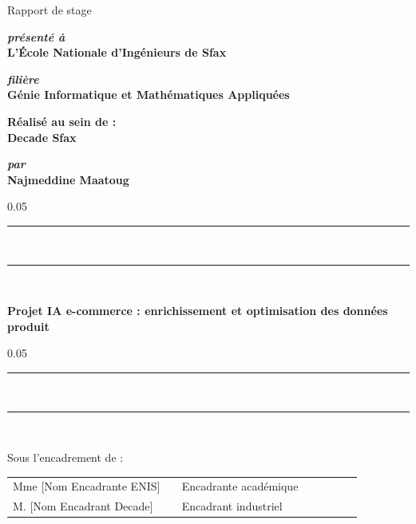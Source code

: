 \begin{titlepage}
\begin{center}
\vspace{10pt}
{%
  \renewcommand*{\familydefault}{\defaultFont}
  \fontsize{34pt}{34pt}\selectfont%
  Rapport de stage
}

\vspace{30pt}
\textbf{\textit{présenté à}}\\

\vspace{10pt}
{%
  \renewcommand*{\familydefault}{\defaultFont}
  \fontsize{16pt}{16pt}\selectfont%
  \textbf{L'École Nationale d'Ingénieurs de Sfax}
}

\vspace{20pt}
\textbf{\textit{filière}}\\

\vspace{10pt}
{%
\renewcommand*{\familydefault}{\defaultFont}
\fontsize{14pt}{14pt}\selectfont%
\textbf{Génie Informatique et Mathématiques Appliquées}
}

\vspace{20pt}
{%
\renewcommand*{\familydefault}{\defaultFont}
\fontsize{14pt}{14pt}\selectfont%
\textbf{Réalisé au sein de :}\\
\vspace{8pt}
\textbf{Decade Sfax}
}

\vspace{28pt}
\textbf{\textit{par}}\\
\vspace{8pt}
{%
  \fontsize{18pt}{18pt}\selectfont%
  \textbf{Najmeddine Maatoug}
}

\vspace{20pt}
{%
  \begin{spacing}{0.05}
    \rule{420pt}{2pt}\\
    \rule{420pt}{0.75pt}\\
  \end{spacing}
  \renewcommand*{\familydefault}{\defaultFont}
  \fontsize{18pt}{18pt}\selectfont%
  \vspace{12pt}
  \textbf{Projet IA e-commerce : enrichissement et optimisation des données produit}
  \vspace{10pt}
  \begin{spacing}{0.05}
    \rule{420pt}{0.75pt}\\
    \rule{420pt}{2pt}\\
  \end{spacing}
}

\vspace{30pt}
Sous l'encadrement de :\\
\vspace{16pt}
\begin{tabular}{p{0.42\linewidth}p{0.45\linewidth}}
  Mme [Nom Encadrante ENIS] & Encadrante académique \\
  M. [Nom Encadrant Decade] & Encadrant industriel \\
\end{tabular}


\end{center}
\end{titlepage}
